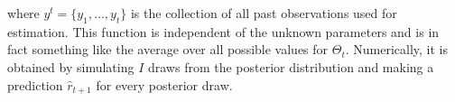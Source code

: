 where $y^t=\{y_1,\ldots,y_t\}$ is the collection of all past observations used for estimation. This function is independent of the unknown parameters and is in fact something like the average over all possible values for $\Theta_t$. Numerically, it is obtained by simulating $I$ draws from the posterior distribution and making a prediction $\hat{r}_{t+1}$ for every posterior draw. %



%

